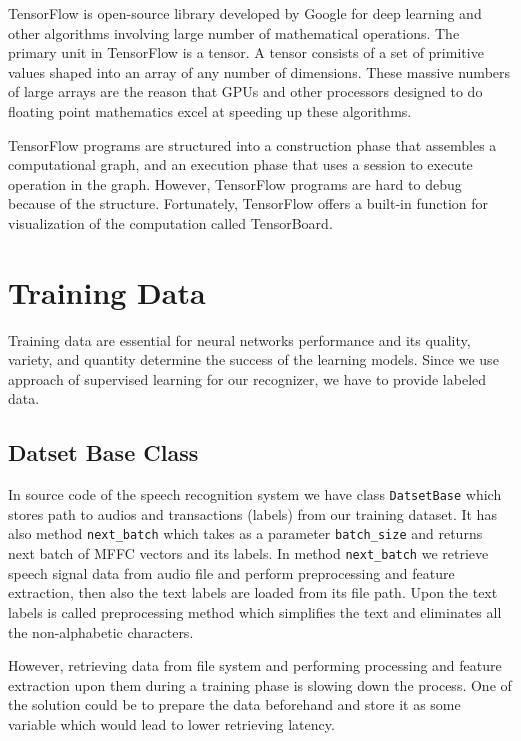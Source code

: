 TensorFlow is open-source library developed by Google for deep learning and other algorithms involving large number of mathematical operations.
The primary unit in TensorFlow is a tensor.
A tensor consists of a set of primitive values shaped into an array of any number of dimensions.
These massive numbers of large arrays are the reason that GPUs and other processors designed to do floating point mathematics excel at speeding up these algorithms.

TensorFlow programs are structured into a construction phase that assembles a computational graph, and an execution phase that uses a session to execute operation in the graph.
However, TensorFlow programs are hard to debug because of the structure. Fortunately, TensorFlow offers a built-in function for visualization of the computation called TensorBoard.

\section{Training Data}

Training data are essential for neural networks performance and its quality, variety, and quantity determine the success of the learning models.
Since we use approach of supervised learning for our recognizer, we have to provide labeled data.

\subsection{Datset Base Class}

In source code of the speech recognition system we have class \texttt{DatsetBase} which stores path to audios and transactions (labels) from our training dataset.
It has also method \texttt{next\_batch} which takes as a parameter \texttt{batch\_size} and returns next batch of MFFC vectors and its labels.
In method \texttt{next\_batch} we retrieve speech signal data from audio file and perform preprocessing and feature extraction, then also the text labels are loaded from its file path.
Upon the text labels is called preprocessing method which simplifies the text and eliminates all the non-alphabetic characters.

However, retrieving data from file system and performing processing and feature extraction upon them during a training phase is slowing down the process.
One of the solution could be to prepare the data beforehand and store it as some variable which would lead to lower retrieving latency.

